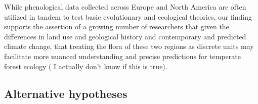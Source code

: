 \documentclass[12pt]{article}
\begin{document}
\noindeny While phenological data collected across Europe and North America are often utilized in tandem to test basic evolutionary and ecological theories, our finding supports the assertion of a growing number of researchers that given the differences in land use and geological history and contemporary and predicted climate change, that treating the flora of these two regions as discrete units may facilitate more nuanced understanding and precise predictions for temperate forest ecology ( I actually don't know if this is true). %

\subsection*{Alternative hypotheses}
\end{document}
